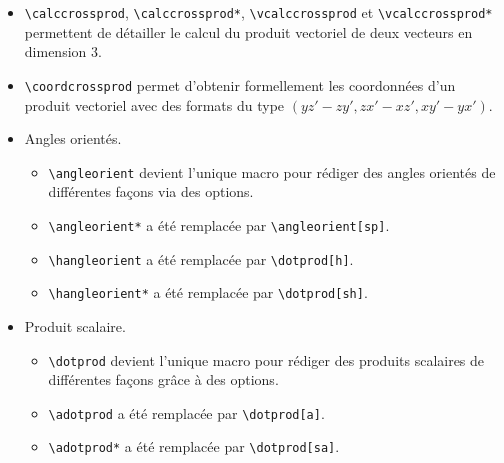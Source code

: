 \documentclass[12pt,a4paper]{book}
\newcommand\env[1]{\texttt{#1}}
\newcommand\macro[1]{\env{\textbackslash{}#1}}
\theoremstyle{definition}
\begin{document}
{{\begin{description}
\begin{itemize}[itemsep=.5em]
\begin{itemize}[itemsep=.5em]
    
            \item \macro{calccrossprod}, \macro{calccrossprod*}, \macro{vcalccrossprod} et \macro{vcalccrossprod*} permettent de détailler le calcul du produit vectoriel de deux vecteurs en dimension $3$.
    
            \item \macro{coordcrossprod} permet d'obtenir formellement les coordonnées d'un produit vectoriel avec des formats du type $(y z' - z y' , z x' - x z ' , x y' - y x')$.
    
    
            \item Angles orientés.
            
            \begin{itemize}[itemsep=.5em, label=$\rightarrow$]
                \item \macro{angleorient} devient l'unique macro pour rédiger des angles orientés de différentes façons via des options.
                
                \item \macro{angleorient*}  a été remplacée par \macro{angleorient[sp]}.
                
                \item \macro{hangleorient}  a été remplacée par \macro{dotprod[h]}.
                      
                \item \macro{hangleorient*} a été remplacée par \macro{dotprod[sh]}.
    	    \end{itemize}
    
    
            \item Produit scalaire.
            
            \begin{itemize}[itemsep=.5em, label=$\rightarrow$]
                \item \macro{dotprod} devient l'unique macro pour rédiger des produits scalaires de différentes façons grâce à des options.
                
                \item \macro{adotprod}  a été remplacée par \macro{dotprod[a]}.
    
                \item \macro{adotprod*} a été remplacée par \macro{dotprod[sa]}.
    	    \end{itemize}
    

\end{itemize}
\end{itemize}
\end{description}}}
\end{document}

